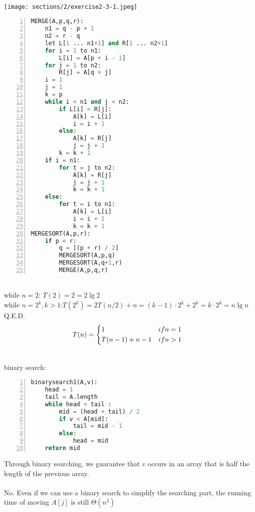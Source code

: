 \\
\texttt{[image: sections/2/exercise2-3-1.jpeg]}\\


\begin{lstlisting}[language=Python,numbers=left,numberstyle=\normalsize]
MERGE(A,p,q,r):
    n1 = q - p + 1
    n2 = r - q
    let L[1 ... n1+1] and R[1 ... n2+1]
    for i = 1 to n1:
        L[i] = A[p + i - 1]
    for j = 1 to n2:
        R[j] = A[q + j]
    i = 1
    j = 1
    k = p
    while i < n1 and j < n2:
        if L[i] < R[j]:
            A[k] = L[i]
            i = i + 1
        else:
            A[k] = R[j]
            j = j + 1
        k = k + 1
    if i = n1:
        for t = j to n2:
            A[k] = R[j]
            j = j + 1
            k = k + 1
    else:
        for t = i to n1:
            A[k] = L[i]
            i = i + 1
            k = k + 1
MERGESORT(A,p,r):
    if p < r:
        q = [(p + r) / 2]
        MERGESORT(A,p,q)
        MERGESORT(A,q+1,r)
        MERGE(A,p,q,r)
\end{lstlisting}


\\
while $ n=2 $: $ T(2)=2=2\lg 2 $\\
while $ n=2^k , k>1 $:$ T(2^k)=2T(n/2)+n=(k-1)\cdot 2^k +2^k=k\cdot 2^k=n\lg n$\\
Q.E.D.\\


\begin{align}
T(n)=\begin{dcases}
    1 & if n = 1\\
    T(n - 1) + n - 1 & if n > 1
\end{dcases}\notag
\end{align}


\\
binary search:
\begin{lstlisting}[language=Python,numbers=left,numberstyle=\normalsize]
binarysearch1(A,v):
    head = 1
    tail = A.length
    while head < tail :
        mid = (head + tail) / 2
        if v < A[mid]:
            tail = mid - 1
        else:
            head = mid
    return mid
\end{lstlisting}
Through binary searching, we guarantee that $ v $ occurs 
in an array that is half the length of the previous array.\\


\\
No. Even if we can use a binary search to simplify the searching part, 
the running time of moving $A[j]$ is still $\Theta(n^2)$